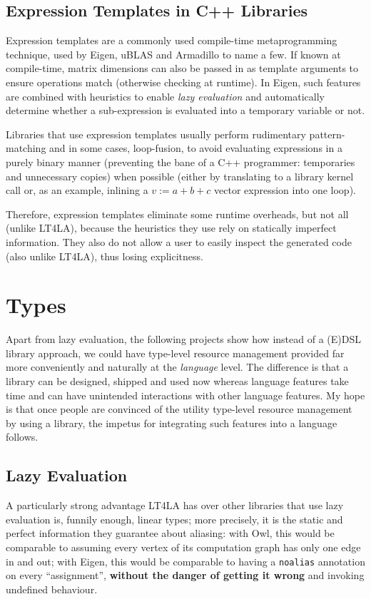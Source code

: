 \subsection{Expression Templates in C++ Libraries}

Expression templates are a commonly used compile-time metaprogramming
technique, used by Eigen, uBLAS and Armadillo to name a few. If known at
compile-time, matrix dimensions can also be passed in as template arguments to
ensure operations match (otherwise checking at runtime). In Eigen, such
features are combined with heuristics to enable \emph{lazy evaluation} and
automatically determine whether a sub-expression is evaluated into a temporary
variable or not.

Libraries that use expression templates usually perform rudimentary pattern-matching and in some cases, loop-fusion, to
avoid evaluating expressions in a purely binary manner (preventing the bane of a
C++ programmer: temporaries and unnecessary copies) when possible (either by
translating to a library kernel call or, as an example, inlining a $v := a + b
+ c$ vector expression into one loop).

Therefore, expression templates eliminate some runtime overheads, but not all
(unlike LT4LA), because the heuristics they use rely on statically imperfect
information. They also do not allow a user to easily inspect the generated code
(also unlike LT4LA), thus losing explicitness.

\section{Types}

Apart from lazy evaluation, the following projects show how instead of a (E)DSL
library approach, we could have type-level resource management provided far
more conveniently and naturally at the \emph{language} level. The difference is
that a library can be designed, shipped and used now whereas language features
take time and can have unintended interactions with other language features. My
hope is that once people are convinced of the utility type-level resource
management by using a library, the impetus for integrating such features into
a language follows.

\subsection{Lazy Evaluation}

A particularly strong advantage LT4LA has over other libraries that use lazy
evaluation is, funnily enough, linear types; more precisely, it is the static
and perfect information they guarantee about aliasing: with Owl, this would be
comparable to assuming every vertex of its computation graph has only one edge
in and out; with Eigen, this would be comparable to having a \texttt{noalias}
annotation on every ``assignment'', \textbf{without the danger of getting it
wrong} and invoking undefined behaviour.

